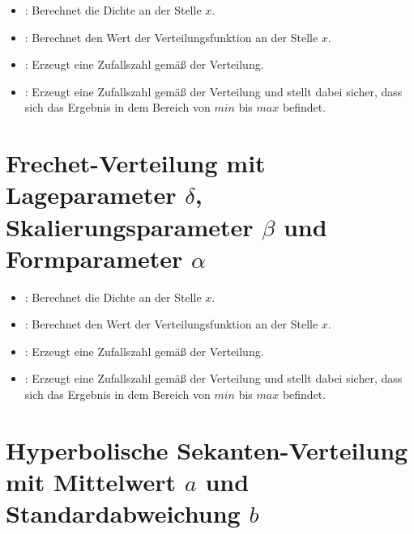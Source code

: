 \begin{itemize}

\item
{}:
Berechnet die Dichte an der Stelle $x$.

\item
{}:
Berechnet den Wert der Verteilungsfunktion an der Stelle $x$.

\item
{}:
Erzeugt eine Zufallszahl gemäß der Verteilung.

\item
{}:
Erzeugt eine Zufallszahl gemäß der Verteilung und stellt dabei sicher, dass sich das Ergebnis in dem Bereich von $min$ bis $max$ befindet.

\end{itemize}



\section{Frechet-Verteilung mit Lageparameter \texorpdfstring{$\delta$}{delta}, Skalierungsparameter \texorpdfstring{$\beta$}{beta} und Formparameter \texorpdfstring{$\alpha$}{alpha}}

\begin{itemize}

\item
{}:
Berechnet die Dichte an der Stelle $x$.

\item
{}:
Berechnet den Wert der Verteilungsfunktion an der Stelle $x$.

\item
{}:
Erzeugt eine Zufallszahl gemäß der Verteilung.

\item
{}:
Erzeugt eine Zufallszahl gemäß der Verteilung und stellt dabei sicher, dass sich das Ergebnis in dem Bereich von $min$ bis $max$ befindet.

\end{itemize}



\section{Hyperbolische Sekanten-Verteilung mit Mittelwert \texorpdfstring{$a$}{a} und Standardabweichung \texorpdfstring{$b$}{b}}

